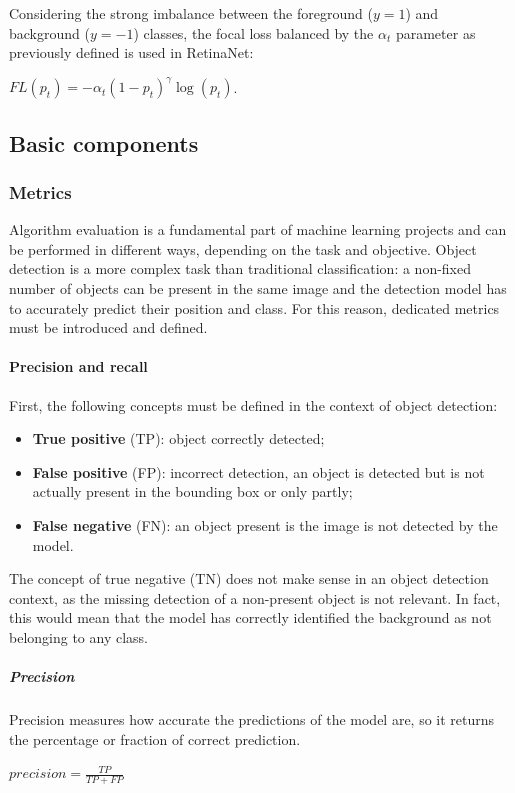 \documentclass[%
    corpo=12pt,
    twoside,
    stile=classica,   
    tipotesi=magistrale,
    evenboxes,
    english,
	numerazioneromana,
]{toptesi}
\begin{document}
Considering the strong imbalance between the foreground ($y=1$) and background ($y=-1$) classes, the focal loss balanced by the $\alpha_t$ parameter as previously defined is used in RetinaNet:
\begin{center}
	$FL(p_t) = -\alpha_t\left(1-p_t\right)^\gamma \log(p_t)$.
\end{center}

\subsection{Basic components}
\subsubsection{Metrics}
Algorithm evaluation is a fundamental part of machine learning projects and can be performed in different ways, depending on the task and objective. Object detection is a more complex task than traditional classification: a non-fixed number of objects can be present in the same image and the detection model has to accurately predict their position and class. For this reason, dedicated metrics must be introduced and defined.

\paragraph{Precision and recall}
First, the following concepts must be defined in the context of object detection:
\begin{itemize}
	\item \textbf{True positive} (TP): object correctly detected;
	\item \textbf{False positive} (FP): incorrect detection, an object is detected but is not actually present in the bounding box or only partly;
	\item \textbf{False negative} (FN): an object present is the image is not detected by the model.
\end{itemize}
The concept of true negative (TN) does not make sense in an object detection context, as the missing detection of a non-present object is not relevant. In fact, this would mean that the model has correctly identified the background as not belonging to any class.

\subparagraph{Precision}
Precision measures how accurate the predictions of the model are, so it returns the percentage or fraction of correct prediction.
\begin{center}
	$precision = \frac{TP}{TP+FP}$
\end{center}
\end{document}
